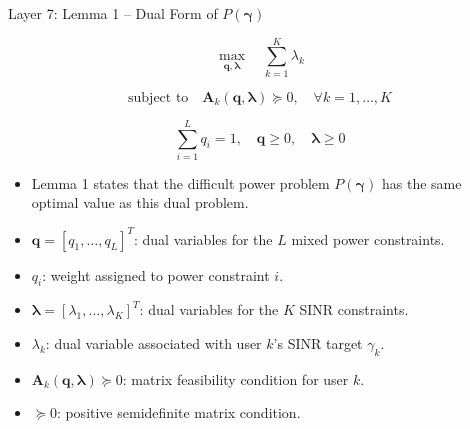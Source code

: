 \documentclass{beamer}
\begin{document}
\begin{frame}{Layer 7: Lemma 1 -- Dual Form of \(P(\boldsymbol{\gamma})\)}
\scriptsize

\[
\max_{\mathbf{q},\boldsymbol{\lambda}}
\quad
\sum_{k=1}^{K}\lambda_k
\]

\[
\text{subject to}
\quad
\mathbf{A}_k(\mathbf{q},\boldsymbol{\lambda})\succeq 0,
\quad \forall k=1,\ldots,K
\]

\[
\sum_{i=1}^{L}q_i=1,
\quad
\mathbf{q}\ge 0,
\quad
\boldsymbol{\lambda}\ge 0
\]

\begin{itemize}
    \item Lemma 1 states that the difficult power problem \(P(\boldsymbol{\gamma})\) has the same optimal value as this dual problem.
    \item \(\mathbf{q}=[q_1,\ldots,q_L]^T\): dual variables for the \(L\) mixed power constraints.
    \item \(q_i\): weight assigned to power constraint \(i\).
    \item \(\boldsymbol{\lambda}=[\lambda_1,\ldots,\lambda_K]^T\): dual variables for the \(K\) SINR constraints.
    \item \(\lambda_k\): dual variable associated with user \(k\)'s SINR target \(\gamma_k\).
    \item \(\mathbf{A}_k(\mathbf{q},\boldsymbol{\lambda})\succeq0\): matrix feasibility condition for user \(k\).
    \item \(\succeq0\): positive semidefinite matrix condition.
\end{itemize}

\end{frame}
\end{document}
